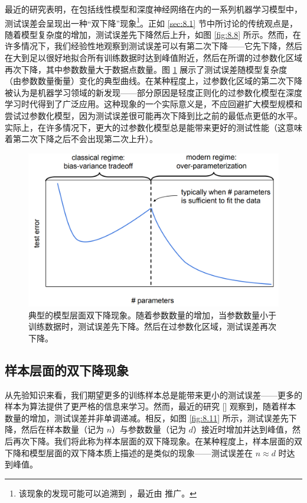 最近的研究表明，在包括线性模型和深度神经网络在内的一系列机器学习模型中，测试误差会呈现出一种“双下降”现象\footnote{该现象的发现可能可以追溯到 \cite{opper1995statistical,opper2001learning}，最近由 \cite{belkin2020two,hastie2022surprises} 推广。}。正如 \ref{sec:8.1} 节中所讨论的传统观点是，随着模型复杂度的增加，测试误差先下降然后上升，如图 \ref{fig:8.8} 所示。然而，在许多情况下，我们经验性地观察到测试误差可以有第二次下降——它先下降，然后在大到足以很好地拟合所有训练数据时达到峰值附近，然后在所谓的过参数化区域再次下降，其中参数数量大于数据点数量。图 \ref{fig:8.10} 展示了测试误差随模型复杂度（由参数数量衡量）变化的典型曲线。在某种程度上，过参数化区域的第二次下降被认为是机器学习领域的新发现——部分原因是轻度正则化的过参数化模型在深度学习时代得到了广泛应用。这种现象的一个实际意义是，不应回避扩大模型规模和尝试过参数化模型，因为测试误差很可能再次下降到比之前的最低点更低的水平。实际上，在许多情况下，更大的过参数化模型总是能带来更好的测试性能（这意味着第二次下降之后不会出现第二次上升）。

\begin{figure}[H]
    \centering
    \includegraphics[width=0.8\linewidth]{figs/double_descent.png}
    \caption{典型的模型层面双下降现象。随着参数数量的增加，当参数数量小于训练数据时，测试误差先下降。然后在过参数化区域，测试误差再次下降。}
    \label{fig:8.10}
\end{figure}

\subsection*{样本层面的双下降现象}

从先验知识来看，我们期望更多的训练样本总是能带来更小的测试误差——更多的样本为算法提供了更严格的信息来学习。然而，最近的研究 [\cite{nakkiran2019more}] 观察到，随着样本数量的增加，测试误差并非单调递减。相反，如图 \ref{fig:8.11} 所示，测试误差先下降，然后在样本数量（记为 $n$）与参数数量（记为 $d$）接近时增加并达到峰值，然后再次下降。我们将此称为样本层面的双下降现象。在某种程度上，样本层面的双下降和模型层面的双下降本质上描述的是类似的现象——测试误差在 $n \approx d$ 时达到峰值。


